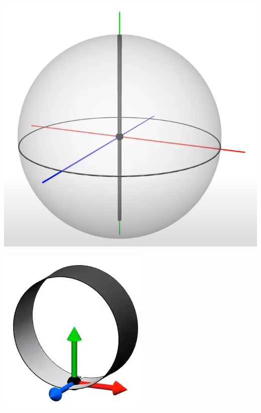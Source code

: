 \documentclass[10pt]{beamer}
\begin{document}
    \includegraphics[scale=0.1]{Pictures/yaxissphere.png}

    \includegraphics[scale=0.1]{Pictures/zaxisbelt.png}
\end{document}
